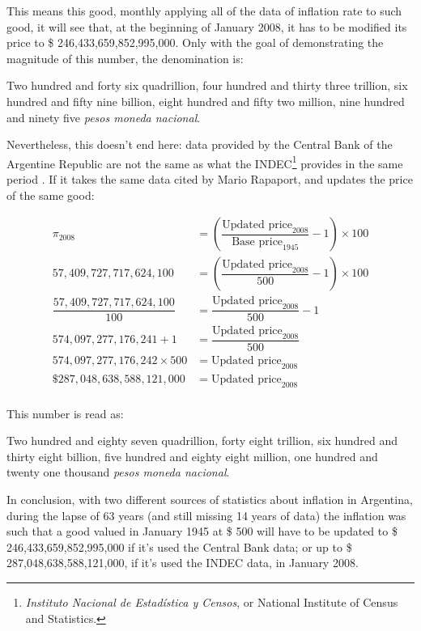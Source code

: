 \documentclass[12pt,a4paper,twoside]{book}
\begin{document}
This means this good, monthly applying all of the data of inflation rate to such good, it will see that, at the beginning of January 2008, it has to be modified its price to \$ 246,433,659,852,995,000. Only with the goal of demonstrating the magnitude of this number, the denomination is:

\begin{center}
Two hundred and forty six quadrillion, four hundred and thirty three trillion, six hundred and fifty nine billion, eight hundred and fifty two million, nine hundred and ninety five \textit{pesos moneda nacional}.
\end{center}

Nevertheless, this doesn't end here: data provided by the Central Bank of the Argentine Republic are not the same as what the INDEC\footnote{\textit{Instituto Nacional de Estadística y Censos}, or National Institute of Census and Statistics.} provides in the same period \cite[p. 16]{indec-hist}. If it takes the same data cited by Mario Rapaport, and updates the price of the same good:

\begin{align*}
\pi_{2008} &= \left( \dfrac{\text{Updated price}_{2008}}{\text{Base price}_{1945}} - 1 \right) \times 100 \\
57,409,727,717,624,100 &= \left( \dfrac{\text{Updated price}_{2008}}{500} - 1 \right) \times 100 \\
\dfrac{57,409,727,717,624,100}{100} &= \dfrac{\text{Updated price}_{2008}}{500} - 1 \\
574,097,277,176,241 + 1 &= \dfrac{\text{Updated price}_{2008}}{500} \\
574,097,277,176,242 \times 500 &= \text{Updated price}_{2008} \\
\text{\$ } 287,048,638,588,121,000 &= \text{Updated price}_{2008} \\
\end{align*}

This number is read as:

\begin{center}
Two hundred and eighty seven quadrillion, forty eight trillion, six hundred and thirty eight billion, five hundred and eighty eight million, one hundred and twenty one thousand \textit{pesos moneda nacional}.
\end{center}

In conclusion, with two different sources of statistics about inflation in Argentina, during the lapse of 63 years (and still missing 14 years of data) the inflation was such that a good valued in January 1945 at \$ 500 will have to be updated to \$ 246,433,659,852,995,000 if it's used the Central Bank data; or up to \$ 287,048,638,588,121,000, if it's used the INDEC data, in January 2008.
\end{document}
